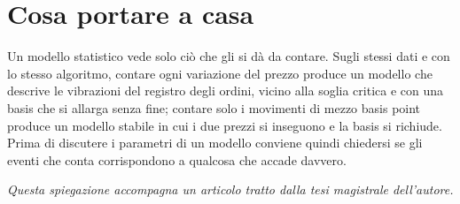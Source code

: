 \documentclass[a4paper,11pt]{article}
\begin{document}
\section*{Cosa portare a casa}

Un modello statistico vede solo ciò che gli si dà da contare. Sugli stessi dati e con lo stesso algoritmo, contare ogni variazione del prezzo produce un modello che descrive le vibrazioni del registro degli ordini, vicino alla soglia critica e con una basis che si allarga senza fine; contare solo i movimenti di mezzo basis point produce un modello stabile in cui i due prezzi si inseguono e la basis si richiude. Prima di discutere i parametri di un modello conviene quindi chiedersi se gli eventi che conta corrispondono a qualcosa che accade davvero.

\vspace{1em}
\noindent\textit{Questa spiegazione accompagna un articolo tratto dalla tesi magistrale dell'autore.}
\end{document}
